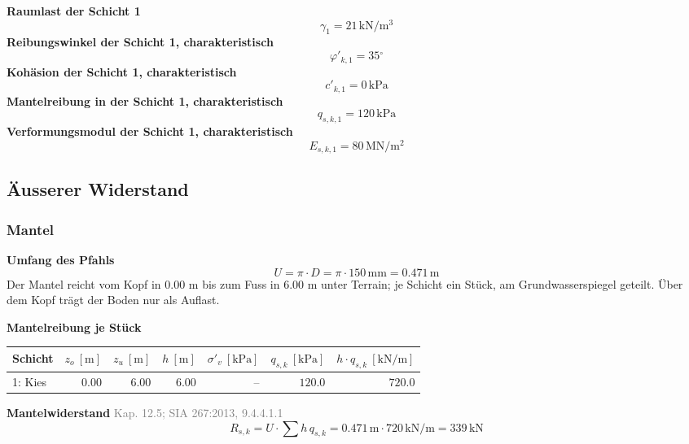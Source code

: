 \documentclass[11pt,a4paper]{article}
\newcommand{\normref}[1]{{\small\textcolor{gray}{#1}}}
\begin{document}
\noindent\textbf{Raumlast der Schicht 1}
\begin{equation*}
\gamma_{1} = 21\,\mathrm{kN}/\mathrm{m}^{3}
\end{equation*}
\noindent\textbf{Reibungswinkel der Schicht 1, charakteristisch}
\begin{equation*}
\varphi'_{k,1} = 35{}^{\circ}
\end{equation*}
\noindent\textbf{Kohäsion der Schicht 1, charakteristisch}
\begin{equation*}
c'_{k,1} = 0\,\mathrm{kPa}
\end{equation*}
\noindent\textbf{Mantelreibung in der Schicht 1, charakteristisch}
\begin{equation*}
q_{s,k,1} = 120\,\mathrm{kPa}
\end{equation*}
\noindent\textbf{Verformungsmodul der Schicht 1, charakteristisch}
\begin{equation*}
E_{s,k,1} = 80\,\mathrm{MN}/\mathrm{m}^{2}
\end{equation*}
\subsection{Äusserer Widerstand}
\subsubsection{Mantel}
\noindent\textbf{Umfang des Pfahls}
\begin{equation*}
U = \pi \cdot D = \pi \cdot 150\,\mathrm{mm} = 0.471\,\mathrm{m}
\end{equation*}
Der Mantel reicht vom Kopf in 0.00 m bis zum Fuss in 6.00 m unter Terrain; je Schicht ein Stück, am Grundwasserspiegel geteilt. Über dem Kopf trägt der Boden nur als Auflast.

\noindent\textbf{Mantelreibung je Stück}
\begin{longtable}{lrrrrrr}
\hline
Schicht & $z_o\ [\mathrm{m}]$ & $z_u\ [\mathrm{m}]$ & $h\ [\mathrm{m}]$ & $\sigma'_v\ [\mathrm{kPa}]$ & $q_{s,k}\ [\mathrm{kPa}]$ & $h \cdot q_{s,k}\ [\mathrm{kN/m}]$ \\
\hline
\endhead
1: Kies & $0.00$ & $6.00$ & $6.00$ & – & $120.0$ & $720.0$ \\
\hline
\end{longtable}
\noindent\textbf{Mantelwiderstand} \hfill \normref{Kap. 12.5; SIA 267:2013, 9.4.4.1.1}
\begin{equation*}
R_{s,k} = U \cdot \sum h \, q_{s,k} = 0.471\,\mathrm{m} \cdot 720\,\mathrm{kN}/\mathrm{m} = 339\,\mathrm{kN}
\end{equation*}
\end{document}
